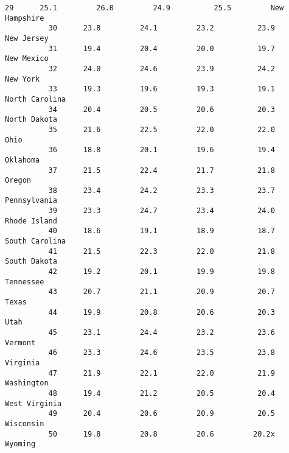 \documentclass[11pt]{article}
\begin{document}
\begin{Verbatim}[commandchars=\\\{\}]
          29      25.1         26.0         24.9          25.5         New Hampshire   
          30      23.8         24.1         23.2          23.9            New Jersey   
          31      19.4         20.4         20.0          19.7            New Mexico   
          32      24.0         24.6         23.9          24.2              New York   
          33      19.3         19.6         19.3          19.1        North Carolina   
          34      20.4         20.5         20.6          20.3          North Dakota   
          35      21.6         22.5         22.0          22.0                  Ohio   
          36      18.8         20.1         19.6          19.4              Oklahoma   
          37      21.5         22.4         21.7          21.8                Oregon   
          38      23.4         24.2         23.3          23.7          Pennsylvania   
          39      23.3         24.7         23.4          24.0          Rhode Island   
          40      18.6         19.1         18.9          18.7        South Carolina   
          41      21.5         22.3         22.0          21.8          South Dakota   
          42      19.2         20.1         19.9          19.8             Tennessee   
          43      20.7         21.1         20.9          20.7                 Texas   
          44      19.9         20.8         20.6          20.3                  Utah   
          45      23.1         24.4         23.2          23.6               Vermont   
          46      23.3         24.6         23.5          23.8              Virginia   
          47      21.9         22.1         22.0          21.9            Washington   
          48      19.4         21.2         20.5          20.4         West Virginia   
          49      20.4         20.6         20.9          20.5             Wisconsin   
          50      19.8         20.8         20.6         20.2x               Wyoming   
          

\end{Verbatim}
\end{document}
